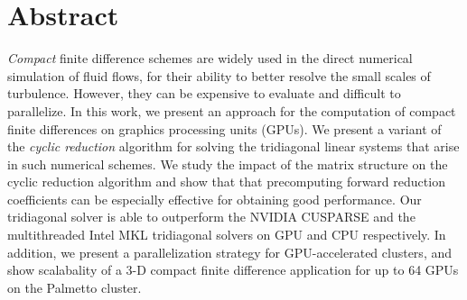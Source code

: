 \chapter*{Abstract}

\emph{Compact} finite difference schemes are widely used
in the direct numerical simulation of fluid flows,
for their ability to better resolve the small scales of turbulence.
However, they can be expensive to evaluate and
difficult to parallelize.
In this work, we present an approach for the computation
of compact finite differences
on graphics processing units (GPUs).
We present a variant of the \emph{cyclic reduction} 
algorithm for solving the
tridiagonal linear systems that arise in such numerical schemes.
We study the impact of the matrix structure on
the cyclic reduction algorithm
and show that that precomputing
forward reduction coefficients can be
especially effective for obtaining good performance.
Our tridiagonal solver is able to outperform
the NVIDIA CUSPARSE
and the multithreaded Intel MKL tridiagonal solvers
on GPU and CPU respectively.
In addition,
we present a parallelization strategy for GPU-accelerated clusters,
and show scalabality
of a 3-D compact finite difference application
for up to 64 GPUs on the Palmetto cluster.
